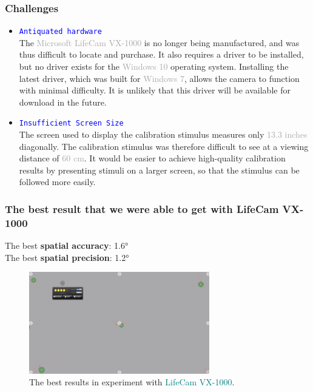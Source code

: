 \documentclass{beamer}
\begin{document}
    \begin{frame}
        \frametitle{Challenges}

        \begin{itemize}
            \item \texttt{\textcolor{blue}{Antiquated hardware}}\\
            The \textcolor{darkgray}{Microsoft LifeCam VX-1000} is no longer being
            manufactured, and was thus difficult to locate and purchase.
            It also requires a driver to be installed, but no driver exists for
            the \textcolor{darkgray}{Windows 10} operating system.
            Installing the latest driver, which was built for
            \textcolor{darkgray}{Windows 7}, allows
            the camera to function with minimal difficulty.
            It is unlikely that this driver will be available for download in
            the future. \\

            \item \texttt{\textcolor{blue}{Insufficient Screen Size}}\\
            The screen used to display the calibration stimulus measures only
            \textcolor{darkgray}{13.3 inches} diagonally.
            The calibration stimulus was therefore difficult to see at a viewing
            distance of \textcolor{darkgray}{60 cm}.
            It would be easier to achieve high-quality calibration results by
            presenting stimuli on a larger screen, so that the stimulus can be
            followed more easily.
        \end{itemize}

    \end{frame}

    \begin{frame}
        \frametitle{The best result that we were able to get with LifeCam VX-1000}

        \center
        The best \textbf{spatial accuracy}: \ang{1.6} \\
        The best \textbf{spatial precision}: \ang{1.2}

        \begin{figure}
            \begin{center}
                \includegraphics[width=0.7\textwidth]{Best_res_VX_1000.jpg}
            \end{center}
            \caption{The best results in experiment with
            \textcolor{teal}{LifeCam VX-1000}.}
            \label{fig:Best_VX}
        \end{figure}

    \end{frame}
\end{document}
